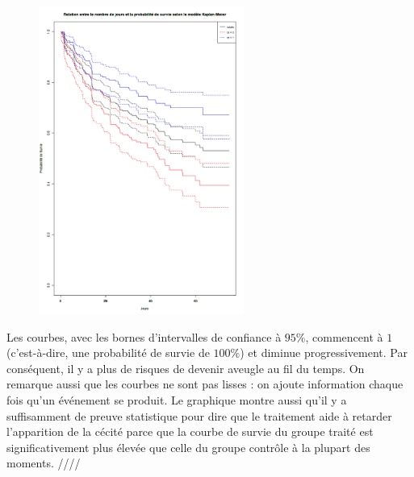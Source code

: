 \documentclass[../main.tex]{subfiles}
\begin{document}
\begin{CJK*}{UTF8}{gbsn}
\begin{figure}[H]
  \centering
  \includegraphics[width=0.6\textwidth]{1bc.png}
  \label{fig:mesh1}
\end{figure}

Les courbes, avec les bornes d'intervalles de confiance à $95 \%$, commencent à $1$ 
(c'est-à-dire, une probabilité de survie de $100 \%$) 
et diminue progressivement.
Par conséquent, il y a plus de risques de devenir aveugle au fil du temps.
On remarque aussi que les courbes ne sont pas lisses :
on ajoute information chaque fois qu'un événement se produit.
Le graphique montre aussi qu'il y a suffisamment de preuve statistique
pour dire que le traitement aide à retarder l'apparition de la cécité
parce que la courbe de survie du groupe traité est significativement
plus élevée que celle du groupe contrôle à la plupart des moments. ////

\end{CJK*}
\end{document}
